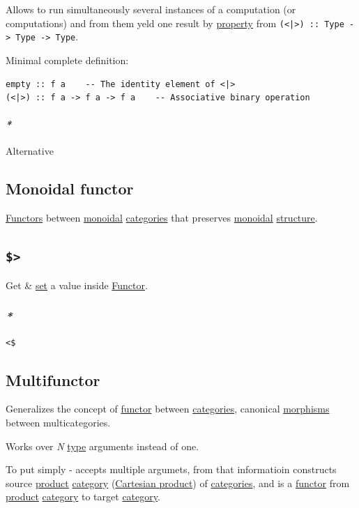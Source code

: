 \documentclass[a4paper,14pt,oneside]{book}
\begin{document}
Allows to run simultaneously several instances of a computation (or computations) and from them yeld one result by \hyperref[org1ea27a4]{property} from \texttt{(<|>) :: Type -> Type -> Type}.

Minimal complete definition:
\begin{verbatim}
empty :: f a    -- The identity element of <|>
(<|>) :: f a -> f a -> f a    -- Associative binary operation
\end{verbatim}

\paragraph{\emph{*}}
\label{sec:orgff4caab}

\label{org8f98483}Alternative

\subsection{\label{orgcb12437}Monoidal functor}
\label{sec:orgb6c517d}
\hyperref[orgc9bd0d4]{Functors} between \hyperref[org28da70f]{monoidal} \hyperref[org5975e79]{categories} that preserves \hyperref[org28da70f]{monoidal} \hyperref[org77aabc9]{structure}.

\subsection{\texttt{\$>}}
\label{sec:org3cf9eaf}
Get \& \hyperref[org1d38363]{set} a value inside \hyperref[org3453768]{Functor}.

\subsubsection{\emph{*}}
\label{sec:org98bce0e}

\texttt{<\$}

\subsection{\label{org072198e}Multifunctor}
\label{sec:org3279760}
Generalizes the concept of \hyperref[org3453768]{functor} between \hyperref[org5975e79]{categories}, canonical \hyperref[orgb339612]{morphisms} between multicategories.

Works over \emph{N} \hyperref[orgd9ae293]{type} arguments instead of one.

To put simply - accepts multiple argumets, from that informatioin constructs source \hyperref[org88e4b4e]{product} \hyperref[org47992f4]{category} (\hyperref[orgf356c78]{Cartesian product}) of \hyperref[org5975e79]{categories}, and is a \hyperref[org3453768]{functor} from \hyperref[org88e4b4e]{product} \hyperref[org47992f4]{category} to target \hyperref[org47992f4]{category}.
\end{document}

